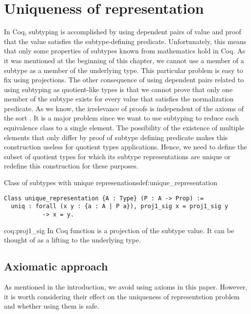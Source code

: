 \section{Uniqueness of representation}
In Coq, subtyping is accomplished by using dependent pairs of value and proof that the value satisfies the subtype-defining predicate. Unfortunately, this means that only some properties of subtypes known from mathematics hold in Coq. As it was mentioned at the beginning of this chapter, we cannot use a member of a subtype as a member of the underlying type. This particular problem is easy to fix using projections. The other consequence of using dependent pairs related to using subtyping as quotient-like types is that we cannot prove that only one member of the subtype exists for every value that satisfies the normalization predicate. As we know, the irrelevance of proofs is independent of the axioms of the  sort \cite{CoqBook2}. It is a major problem since we want to use subtyping to reduce each equivalence class to a single element. The possibility of the existence of multiple elements that only differ by proof of subtype defining predicate makes this construction useless for quotient types applications. Hence, we need to define the subset of quotient types for which its subtype representations are unique or redefine this construction for these purposes.
\begin{defi}{Class of subtypes with unique represenations}{def:unique_representation}
\begin{verbatim}
Class unique_representation {A : Type} (P : A -> Prop) := 
  uniq : forall (x y : {a : A | P a}), proj1_sig x = proj1_sig y 
           -> x = y.
\end{verbatim}
\end{defi}
\begin{coq}{}{coq:proj1_sig}
In Coq function  is a projection of the subtype value. It can be thought of as a lifting to the underlying type.
\end{coq}
\subsection{Axiomatic approach}
As mentioned in the introduction, we avoid using axioms in this paper. However, it is worth considering their effect on the uniqueness of representstion problem and whether using them is safe.
